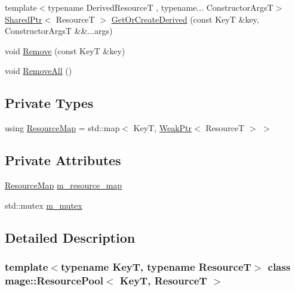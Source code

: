 \begin{DoxyCompactItemize}
\item 
{\footnotesize template$<$typename Derived\+ResourceT , typename... Constructor\+ArgsT$>$ }\\\hyperlink{namespacemage_a1e01ae66713838a7a67d30e44c67703e}{Shared\+Ptr}$<$ ResourceT $>$ \hyperlink{classmage_1_1_resource_pool_a166555e49ffdea663bdae8177cda7595}{Get\+Or\+Create\+Derived} (const KeyT \&key, Constructor\+ArgsT \&\&...args)
\item 
void \hyperlink{classmage_1_1_resource_pool_a58801a2c21f973e18b84277ddaa60d74}{Remove} (const KeyT \&key)
\item 
void \hyperlink{classmage_1_1_resource_pool_a23cac3f3462c375973ee15a5b87d6284}{Remove\+All} ()
\end{DoxyCompactItemize}
\subsection*{Private Types}
\begin{DoxyCompactItemize}
\item 
using \hyperlink{classmage_1_1_resource_pool_a7ae3cfa639bbc3696fa359673fed6153}{Resource\+Map} = std\+::map$<$ KeyT, \hyperlink{namespacemage_aa159a63c0d58464bdf32dfe419dd5dc1}{Weak\+Ptr}$<$ ResourceT $>$ $>$
\end{DoxyCompactItemize}
\subsection*{Private Attributes}
\begin{DoxyCompactItemize}
\item 
\hyperlink{classmage_1_1_resource_pool_a7ae3cfa639bbc3696fa359673fed6153}{Resource\+Map} \hyperlink{classmage_1_1_resource_pool_a5b72496aa427f783a6de90d8ee7ff2a5}{m\+\_\+resource\+\_\+map}
\item 
std\+::mutex \hyperlink{classmage_1_1_resource_pool_a3d6d7b0e2e9c3271f8ae3b7c2fa704ba}{m\+\_\+mutex}
\end{DoxyCompactItemize}


\subsection{Detailed Description}
\subsubsection*{template$<$typename KeyT, typename ResourceT$>$\newline
class mage\+::\+Resource\+Pool$<$ Key\+T, Resource\+T $>$}

